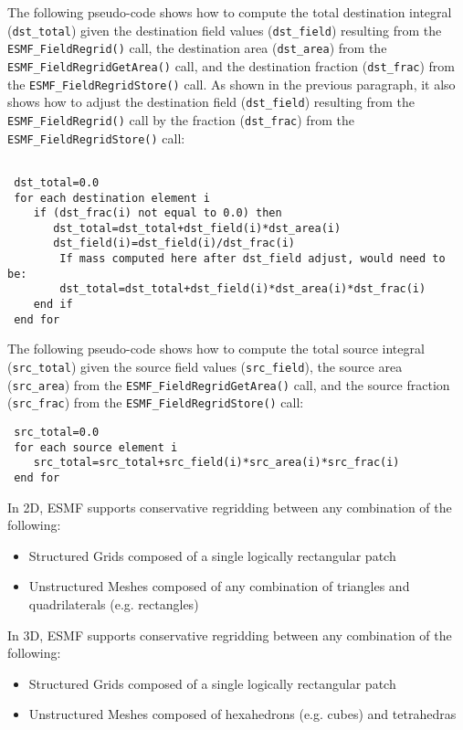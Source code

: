  The following pseudo-code shows how to compute the total destination integral ({\tt dst\_total}) given the
 destination field values ({\tt dst\_field}) resulting
 from the {\tt ESMF\_FieldRegrid()} call, the destination area ({\tt dst\_area}) from the {\tt ESMF\_FieldRegridGetArea()}
 call,  and the destination fraction ({\tt dst\_frac}) from the {\tt ESMF\_FieldRegridStore()} call. As shown in the previous paragraph, it also 
 shows how to adjust the destination field ({\tt dst\_field}) resulting from the {\tt ESMF\_FieldRegrid()} call by the
 fraction ({\tt dst\_frac}) from the {\tt ESMF\_FieldRegridStore()} call: 

\begin{verbatim}

 dst_total=0.0
 for each destination element i
    if (dst_frac(i) not equal to 0.0) then
       dst_total=dst_total+dst_field(i)*dst_area(i) 
       dst_field(i)=dst_field(i)/dst_frac(i)
        If mass computed here after dst_field adjust, would need to be:
        dst_total=dst_total+dst_field(i)*dst_area(i)*dst_frac(i) 
    end if
 end for
\end{verbatim}


 The following pseudo-code shows how to compute the total source integral ({\tt src\_total}) given the source field values
 ({\tt src\_field}), the source area ({\tt src\_area}) from the {\tt ESMF\_FieldRegridGetArea()} call, and
 the source fraction ({\tt src\_frac}) from the {\tt ESMF\_FieldRegridStore()} call:

\begin{verbatim}
 src_total=0.0
 for each source element i
    src_total=src_total+src_field(i)*src_area(i)*src_frac(i)
 end for
\end{verbatim}

\smallskip

 In 2D, ESMF supports conservative regridding between any combination of the following:
 \begin{itemize}
 \item Structured Grids composed of a single logically rectangular patch
 \item Unstructured Meshes composed of any combination of triangles and quadrilaterals (e.g. rectangles)
 \end{itemize}

\smallskip

 In 3D, ESMF supports conservative regridding between any combination of the following:
 \begin{itemize}
 \item Structured Grids composed of a single logically rectangular patch
 \item Unstructured Meshes composed of hexahedrons (e.g. cubes) and tetrahedras
 \end{itemize}

